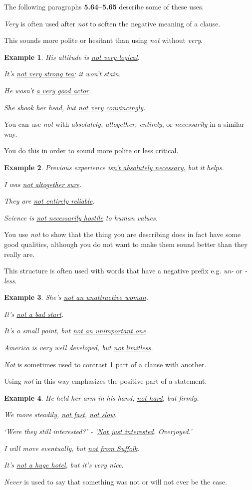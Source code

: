 \documentclass[oneside]{book}
\numberwithin{equation}{section}
\newtheorem{example}{Example}[section]
\begin{document}
The following paragraphs \textbf{5.64--5.65} describe some of these uses.

%
\noindent{} \textit{Very} is often used after \textit{not} to soften the negative meaning of a clause.

This sounds more polite or hesitant than using \textit{not} without \textit{very}.
\begin{example}
    His attitude is \underline{not very logical}.
    
    It's \underline{not very strong tea}; it won't stain.
    
    He wasn't \underline{a very good actor}.
    
    She shook her head, but \underline{not very convincingly}.
\end{example}
You can use \textit{not} with \textit{absolutely, altogether, entirely}, or \textit{necessarily} in a similar way.

You do this in order to sound more polite or less critical.
\begin{example}
    Previous experience is\underline{n't absolutely necessary}, but it helps.
    
    I was \underline{not altogether sure}.
    
    They are \underline{not entirely reliable}.
    
    Science is \underline{not necessarily hostile} to human values.
\end{example}
You use \textit{not} to show that the thing you are describing does in fact have some good qualities, although you do not want to make them sound better than they really are.

This structure is often used with words that have a negative prefix e.g. \textit{un-} or \textit{-less}.
\begin{example}
    She's \underline{not an unattractive woman}.
    
    It's \underline{not a bad start}.
    
    It's a small point, but \underline{not an unimportant one}.
    
    America is very well developed, but \underline{not limitless}.
\end{example}
%
\noindent{} \textit{Not} is sometimes used to contrast 1 part of a clause with another.

Using \textit{not} in this way emphasizes the positive part of a statement.
\begin{example}
    He held her arm in his hand, \underline{not hard}, but firmly.
    
    We move steadily, \underline{not fast}, \underline{not slow}.
    
    `Were they still interested?' - `\underline{Not just interested}. Overjoyed.'
    
    I will move eventually, but \underline{not from Suffolk}.
    
    It's \underline{not a huge hotel}, but it's very nice.
\end{example}
%
\noindent{} \textit{Never} is used to say that something was not or will not ever be the case.
\end{document}

